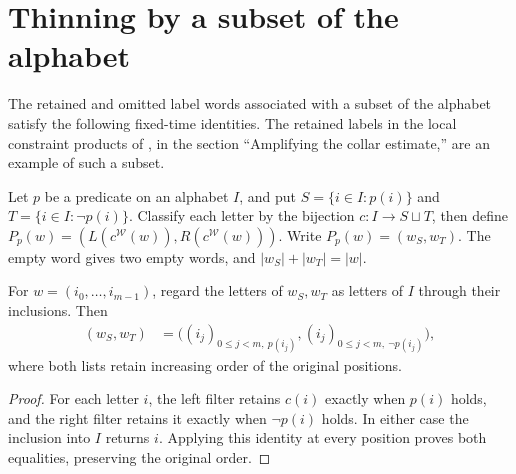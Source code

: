 \section{Thinning by a subset of the alphabet}
\label{sec:poisson_word_partition}

The retained and omitted label words associated with a subset of the
alphabet satisfy the following fixed-time identities. The retained labels
in the local constraint products of \cite{OpenAI2026AreaLaw}, in the section
``Amplifying the collar estimate,'' are an example of such a subset.

\begin{definition}
\label{def:poisson_word_partition}
\leanok
{}
Let $p$ be a predicate on an alphabet $I$, and put
$S=\{i\in I:p(i)\}$ and $T=\{i\in I:\neg p(i)\}$.
Classify each letter by the bijection $c:I\to S\sqcup T$, then define
$P_p(w)=(L(c^{\mathcal W}(w)),R(c^{\mathcal W}(w)))$.
Write $P_p(w)=(w_S,w_T)$. The empty word gives two empty words, and
$|w_S|+|w_T|=|w|$.
\end{definition}

\begin{theorem}
\label{thm:poisson_partition_letters}
\leanok
{}
For $w=(i_0,\ldots,i_{m-1})$, regard the letters of $w_S,w_T$ as letters
of $I$ through their inclusions. Then
\begin{align}
 (w_S,w_T)&=\bigl((i_j)_{0\leq j<m,\ p(i_j)},
                  (i_j)_{0\leq j<m,\ \neg p(i_j)}\bigr),
 \label{eq:poisson_partition_letters}
\end{align}
where both lists retain increasing order of the original positions.
\end{theorem}
\begin{proof}
\leanok
{}
For each letter $i$, the left filter retains $c(i)$ exactly when $p(i)$
holds, and the right filter retains it exactly when $\neg p(i)$ holds.
In either case the inclusion into $I$ returns $i$. Applying this identity
at every position proves both equalities, preserving the original order.
\end{proof}

